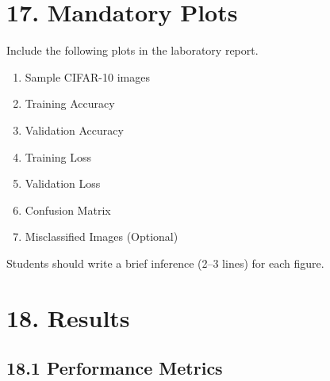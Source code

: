 \documentclass[11pt]{article}
\begin{document}

\section*{17. Mandatory Plots}

Include the following plots in the laboratory report.

\begin{enumerate}

\item Sample CIFAR-10 images

\item Training Accuracy

\item Validation Accuracy

\item Training Loss

\item Validation Loss

\item Confusion Matrix

\item Misclassified Images (Optional)

\end{enumerate}

Students should write a brief inference (2--3 lines) for each figure.


\section*{18. Results}

\subsection*{18.1 Performance Metrics}
\end{document}
